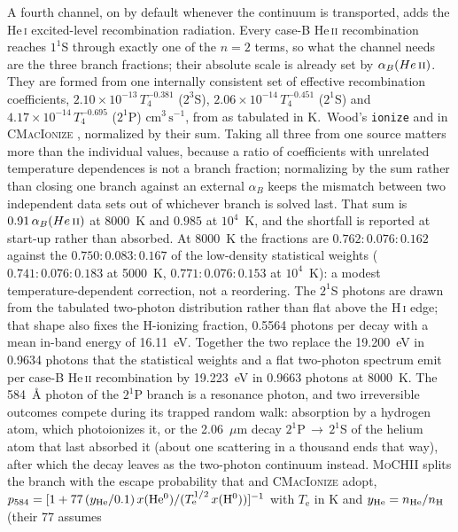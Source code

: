 \documentclass[twocolumn,linenumbers]{aastex702}
\newcommand{\code}[1]{\texttt{#1}}
\newcommand{\MoCHII}{\textsc{MoCHII}}
\newcommand{\HI}{H\,\textsc{i}}
\newcommand{\HeI}{He\,\textsc{i}}
\newcommand{\HeII}{He\,\textsc{ii}}
\newcommand{\Te}{T_{\mathrm{e}}}
\newcommand{\cmc}{\mathrm{cm^{3}\,s^{-1}}}
\begin{document}
A fourth channel, on by default whenever the continuum is transported,
adds the \HeI{} excited-level recombination radiation.  Every case-B \HeII{} recombination reaches $1^1$S through
exactly one of the $n=2$ terms, so what the channel needs are the three
branch fractions; their absolute scale is already set by $\alpha_B(\HeII)$.
They are formed from one internally consistent set of effective
recombination coefficients,
$2.10\times10^{-13}\,T_4^{-0.381}$ ($2^3$S),
$2.06\times10^{-14}\,T_4^{-0.451}$ ($2^1$S) and
$4.17\times10^{-14}\,T_4^{-0.695}$ ($2^1$P) $\cmc$, from
\citet[][Table~1, with J.~S.~Mathis]{benjamin1999} as tabulated in K.~Wood's
\code{ionize} \citep{wood2004} and in \textsc{CMacIonize}
\citep{cmacionize2018}, normalized by their sum.  Taking all three from one
source matters more than the individual values, because a ratio of
coefficients with unrelated temperature dependences is not a branch fraction;
normalizing by the sum rather than closing one branch against an external
$\alpha_B$ keeps the mismatch between two independent data sets out of
whichever branch is solved last.  That sum is $0.91\,\alpha_B(\HeII)$ at
8000~K and $0.985$ at $10^4$~K, and the shortfall is reported at start-up
rather than absorbed.  At 8000~K the fractions are $0.762 : 0.076 : 0.162$
against the $0.750 : 0.083 : 0.167$ of the low-density statistical weights
($0.741 : 0.076 : 0.183$ at 5000~K, $0.771 : 0.076 : 0.153$ at $10^4$~K): a
modest temperature-dependent correction, not a reordering.  The $2^1$S
photons are drawn from the tabulated \citet{drake1969} two-photon
distribution rather than flat above the \HI{} edge; that shape also fixes the
H-ionizing fraction, 0.5564 photons per decay with a mean in-band energy of
16.11~eV.  Together the two replace the 19.200~eV in 0.9634 photons that the
statistical weights and a flat two-photon spectrum emit per case-B \HeII{}
recombination by 19.223~eV in 0.9663 photons at 8000~K.  The 584~\AA{}
photon of the $2^1$P branch is a resonance photon, and two irreversible
outcomes compete during its trapped random walk: absorption by a hydrogen
atom, which photoionizes it, or the 2.06~$\mu$m decay
$2^1$P\,$\to$\,$2^1$S of the helium atom that last absorbed it (about one
scattering in a thousand ends that way), after which the decay leaves as the
two-photon continuum instead.  \MoCHII{} splits the
branch with the escape probability that \citet{wood2004} and
\textsc{CMacIonize} \citep{cmacionize2018} adopt,
$p_{584} = [1 + 77\,(y_{\rm He}/0.1)\,x(\mathrm{He^{0}})/(\Te^{1/2}\,x(\mathrm{H^{0}}))]^{-1}$
with $\Te$ in K and $y_{\rm He} = n_{\rm He}/n_{\rm H}$ (their 77 assumes
\end{document}
